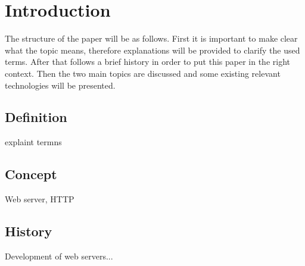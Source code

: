\documentclass[
  a4paper,               %
  twoside,               %
  headings=small,        %
  DIV=12,                %
  BCOR=1cm,              %
  headinclude=true,      %
  footinclude=true,      %
  numbers=noenddot,      %
  11pt]{scrartcl}        %
\begin{document}
\section{Introduction}

The structure of the paper will be as follows. First it is important to make clear what the topic means, therefore explanations will be provided to clarify the used terms. After that follows a brief history in order to put this paper in the right context. Then the two main topics are discussed and some existing relevant technologies will be presented. 

\subsection{Definition}

explaint termns


\subsection{Concept}
Web server, HTTP

\subsection{History}

Development of web servers...
\end{document}
